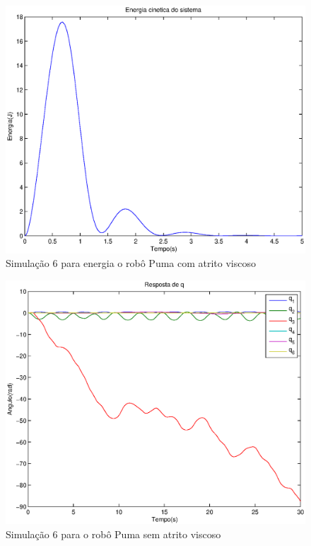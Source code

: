 \documentclass{article}
\begin{document}
\begin{figure}[H]
	\centering
	\includegraphics[width=0.8\linewidth]{../sime1kina}
	\caption{Simulação 6 para energia o robô Puma com atrito viscoso}
	\label{fig:energysim6}
\end{figure}

\begin{figure}[H]
	\centering
	\includegraphics[width=0.8\linewidth]{../longsims/sime2ode.eps}
	\caption{Simulação 6 para o robô Puma sem atrito viscoso}
	\label{fig:pumasim6nf}
\end{figure}
\end{document}
